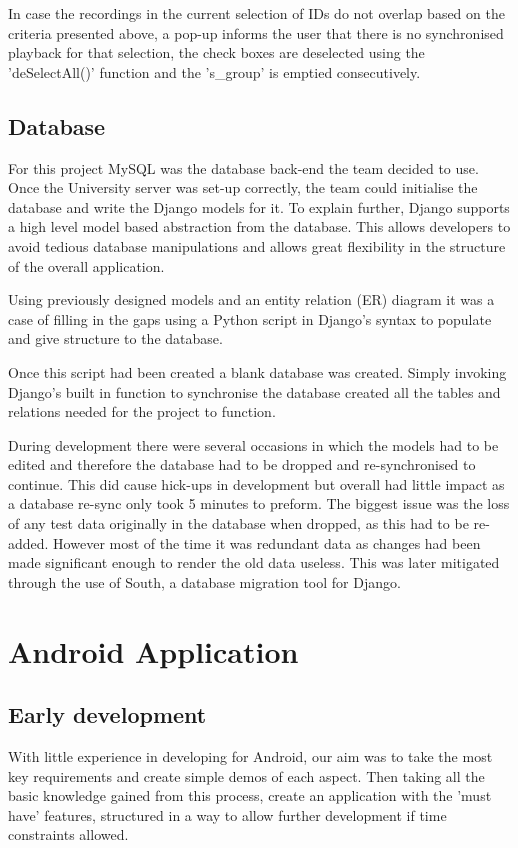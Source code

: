 \documentclass{l3proj}
\begin{document}
In case the recordings in the current selection of IDs do not overlap based on the criteria presented above, a pop-up informs the user that there is no synchronised playback for that selection, the check boxes are deselected using the 'deSelectAll()' function and the 's\_group' is emptied consecutively.

\subsection{Database}
For this project \gls{MySQL} was the database back-end the team decided to use. Once the University server was set-up correctly, the team could initialise the database and write the Django models for it. To explain further, Django supports a high level model based abstraction from the database. This allows developers to avoid tedious database manipulations and allows great flexibility in the structure of the overall application.

Using previously designed models and an entity relation (ER) diagram it was a case of filling in the gaps using a \gls{Python} script in Django's syntax to populate and give structure to the database.

Once this script had been created a blank database was created. Simply invoking Django's built in function to synchronise the database created all the tables and relations needed for the project to function.

During development there were several occasions in which the models had to be edited and therefore the database had to be dropped and re-synchronised to continue. This did cause hick-ups in development but overall had little impact as a database re-sync only took 5 minutes to preform. The biggest issue was the loss of any test data originally in the database when dropped, as this had to be re-added. However most of the time it was redundant data as changes had been made significant enough to render the old data useless. This was later mitigated through the use of South, a database migration tool for Django.
\section{Android Application}

\subsection{Early development} With little experience in developing for Android, our aim was to take the most key requirements and create simple demos of each aspect. Then taking all the basic knowledge gained from this process, create an application with the 'must have' features, structured in a way to allow further development if time constraints allowed.
\end{document}
